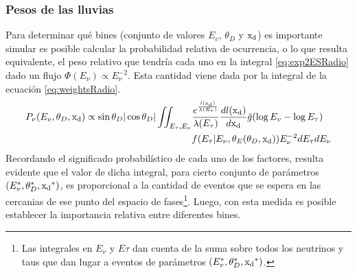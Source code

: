 	\subsubsection{Pesos de las lluvias}
	Para determinar qu\'e bines (conjunto de valores $E_v$, $\theta_D$ y ${\rm x_d}$) es importante simular es posible calcular la probabilidad relativa de ocurrencia, o lo que resulta equivalente, el peso relativo que tendr\'ia cada uno en la integral \ref{eq:exp2ESRadio} dado un flujo $\Phi(E_\nu)\propto E_\nu^{-2}$.
	Esta cantidad viene dada por la integral de la ecuaci\'on \ref{eq:weightsRadio}.
	\begin{equation}
		\begin{aligned}
			P_\nu(E_v,\theta_D,{\rm x_d})
			\propto
			\sin{\theta_D}|\cos{\theta_D}|
			\iint_{E_\tau,E_\nu}&
			\frac{e^{\frac{l({\rm x_d})}{\lambda(E_\tau)}}}{\lambda(E_\tau)}\frac{dl({\rm x_d})}{d{\rm x_d}}
			\tilde{g}(\log E_v-\log E_\tau)\\
			&f(E_\tau|E_\nu,\theta_E(\theta_D,{\rm x_d}))
			E_\nu^{-2}
			dE_\tau dE_\nu
		\end{aligned}
		\label{eq:weightsRadio}
	\end{equation}
	Recordando el significado probabil\'istico de cada uno de los factores, resulta evidente que el valor de dicha integral, para cierto conjunto de par\'ametros $(E_v^*,\theta_D^*,{\rm x_d}^*)$, es proporcional a la cantidad de eventos que se espera en las cercanias de ese punto del espacio de fases\footnote{Las integrales en $E_\nu$ y $E\tau$ dan cuenta de la suma sobre todos los neutrinos y taus que dan lugar a eventos de par\'ametros $(E_v^*,\theta_D^*,{\rm x_d}^*)$.}.
	Luego, con esta medida es posible establecer la importancia relativa entre diferentes bines.
	
